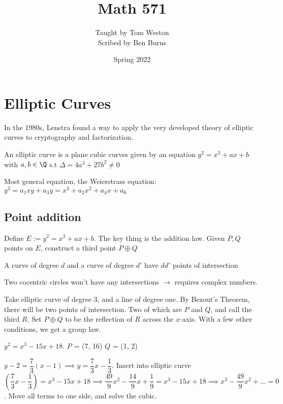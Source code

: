 \documentclass[twoside, 10pt]{article}
\title{Math 571}
\author{Taught by Tom Weston \\ Scribed by Ben Burns}
\affil{UMass Amherst}
\date{Spring 2022}
\begin{document}
\maketitle\thispagestyle{firstpage}

\tableofcontents

\section{Elliptic Curves}
In the 1980s, Lenstra found a way to apply the very developed theory of elliptic curves to cryptography and factorization. 

\begin{defn}
    An elliptic curve is a plane cubic curves given by an equation $y^2 = x^3 + ax + b$ with $a, b \in \Q$ s.t $\Delta = 4a^3 + 27b^2 \neq 0$
\end{defn}

\begin{rmk}
    Most general equation, the Weierstrass equation: $y^2 = a_1xy + a_3y = x^3 + a_2x^2 + a_4x + a_6$
\end{rmk}

\subsection{Point addition}
Define $E := y^2 = x^3 + ax + b$. The key thing is the addition law. Given $P, Q$ points on $E$, construct a third point $P \oplus Q$

\begin{thm}
    A curve of degree $d$ and a curve of degree $d'$ have $dd'$ points of intersection
\end{thm}
Two cocentric circles won't have any intersections $\to$ requires complex numbers. 

Take elliptic curve of degree 3, and a line of degree one. By Bezout's Theorem, there will be two points of intersection. Two of which are $P$ and $Q$, and call the third $R$. Set $P \oplus Q$ to be the reflection of $R$ across the $x$-axis. With a few other conditions, we get a group law.

\begin{exm*}
    $y^2 = x^3 - 15x + 18$. $P$ = (7, 16) $Q$ = (1, 2)
\end{exm*}
$y - 2 = \dfrac{7}{3}(x-1) \implies y = \dfrac{7}{3}x - \dfrac{1}{3}$. Insert into elliptic curve $(\dfrac{7}{3}x - \dfrac{1}{3}) = x^3 - 15x + 18 \implies \dfrac{49}{9}x^2 - \dfrac{14}{9}x + \dfrac{1}{9} = x^3 - 15x + 18 \implies x^3 - \dfrac{49}{9}x^2 + \ldots = 0$. Move all terms to one side, and solve the cubic. 
\end{document}
